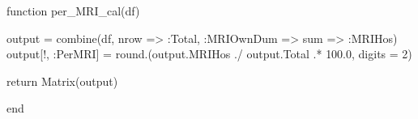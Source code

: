 \documentclass[
  letterpaper,
  DIV=11,
  numbers=noendperiod]{scrreprt}
\newenvironment{Shaded}{\begin{snugshade}}{\end{snugshade}}
\newcommand{\ControlFlowTok}[1]{\textcolor[rgb]{0.00,0.23,0.31}{#1}}
\newcommand{\FloatTok}[1]{\textcolor[rgb]{0.68,0.00,0.00}{#1}}
\newcommand{\FunctionTok}[1]{\textcolor[rgb]{0.28,0.35,0.67}{#1}}
\newcommand{\KeywordTok}[1]{\textcolor[rgb]{0.00,0.23,0.31}{#1}}
\newcommand{\NormalTok}[1]{\textcolor[rgb]{0.00,0.23,0.31}{#1}}
\newcommand{\OperatorTok}[1]{\textcolor[rgb]{0.37,0.37,0.37}{#1}}
\begin{document}
\begin{Shaded}
\begin{Highlighting}[]
\KeywordTok{function} \FunctionTok{per\_MRI\_cal}\NormalTok{(df)}

\NormalTok{    output }\OperatorTok{=} \FunctionTok{combine}\NormalTok{(df, nrow }\OperatorTok{=\textgreater{}} \OperatorTok{:}\NormalTok{Total, }\OperatorTok{:}\NormalTok{MRIOwnDum }\OperatorTok{=\textgreater{}}\NormalTok{ sum }\OperatorTok{=\textgreater{}} \OperatorTok{:}\NormalTok{MRIHos)}
\NormalTok{    output[!, }\OperatorTok{:}\NormalTok{PerMRI] }\OperatorTok{=} \FunctionTok{round}\NormalTok{.(output.MRIHos }\OperatorTok{./}\NormalTok{ output.Total }\OperatorTok{.*} \FloatTok{100.0}\NormalTok{, digits }\OperatorTok{=} \FloatTok{2}\NormalTok{)}
    
    \ControlFlowTok{return} \FunctionTok{Matrix}\NormalTok{(output)}
    
\KeywordTok{end}


\end{Highlighting}
\end{Shaded}
\end{document}
